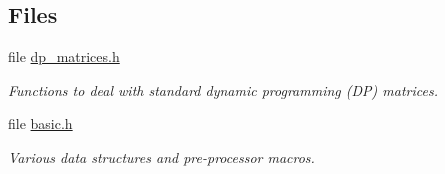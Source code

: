 \subsection*{Files}
\begin{DoxyCompactItemize}
\item 
file \mbox{\hyperlink{dp__matrices_8h}{dp\+\_\+matrices.\+h}}
\begin{DoxyCompactList}\small\item\em Functions to deal with standard dynamic programming (DP) matrices. \end{DoxyCompactList}\item 
file \mbox{\hyperlink{datastructures_2basic_8h}{basic.\+h}}
\begin{DoxyCompactList}\small\item\em Various data structures and pre-\/processor macros. \end{DoxyCompactList}\end{DoxyCompactItemize}
